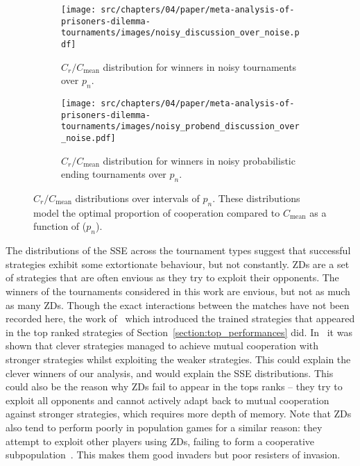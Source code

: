 \begin{figure}[!htbp]
    \centering
    \begin{subfigure}{0.485\textwidth}
        \centering
        \texttt{[image: src/chapters/04/paper/meta-analysis-of-prisoners-dilemma-tournaments/images/noisy\_discussion\_over\_noise.pdf]}
        \caption{\(C_r / C_{\text{mean}}\) distribution for winners in noisy tournaments over
        \(p_n\).}\label{fig:noisy_discussion_over_noise}
    \end{subfigure}
    \hfill
    \begin{subfigure}{0.485\textwidth}
        \centering
        \texttt{[image: src/chapters/04/paper/meta-analysis-of-prisoners-dilemma-tournaments/images/noisy\_probend\_discussion\_over\_noise.pdf]}
        \caption{\(C_r / C_{\text{mean}}\) distribution for winners in noisy probabilistic ending tournaments over
        \(p_n\).}\label{fig:noisy_probend_discussion_over_noise}
    \end{subfigure}
    \caption{\(C_r / C_{\text{mean}}\) distributions over intervals of \(p_n\).
    These distributions model the optimal proportion of cooperation
    compared to \(C_{\text{mean}}\) as a function of (\(p_n\)).}
    \label{fig:compared_to_mean_over_noise_probability}
\end{figure}

The distributions of the SSE across the tournament types suggest that successful
strategies exhibit some extortionate behaviour, but not constantly.
ZDs are a set of strategies that are often envious as they try to exploit their
opponents. The winners of the tournaments considered in this work are
envious, but not as much as many ZDs.
Though the exact interactions between the matches have not been recorded here,
the work of~\cite{Harper2017} which introduced the trained strategies that
appeared in the top ranked strategies of Section~\ref{section:top_performances}
did. In~\cite{Harper2017} it was shown that clever strategies managed to achieve
mutual cooperation with stronger strategies whilst exploiting the weaker
strategies. This could explain the clever winners
of our analysis, and would explain the SSE distributions. This could also
be the reason why ZDs fail to appear in the tops ranks -- they try to exploit
all opponents and cannot actively adapt back to mutual cooperation against
stronger strategies, which requires more depth of memory. Note that
ZDs also tend to perform poorly in population games for a similar reason: they
attempt to exploit other players using ZDs, failing to form a cooperative
subpopulation~\cite{Knight2018}. This makes them good invaders but poor resisters of invasion.

